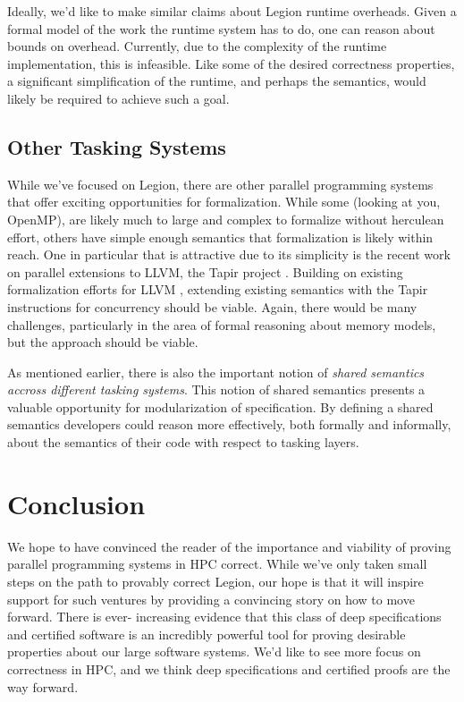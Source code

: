 \documentclass[sigconf]{acmart}
\begin{document}
Ideally, we'd like to make similar claims about Legion runtime overheads.
Given a formal model of the work the runtime system has to do, one can reason
about bounds on overhead. Currently, due to the complexity of the runtime
implementation, this is infeasible. Like some of the desired correctness
properties, a significant simplification of the runtime, and perhaps the
semantics, would likely be required to achieve such a goal.


\subsection{Other Tasking Systems}

While we've focused on Legion, there are other parallel programming systems
that offer exciting opportunities for formalization. While some (looking at
you, OpenMP), are likely much to large and complex to formalize without
herculean effort, others have simple enough semantics that formalization is
likely within reach. One in particular that is attractive due to its simplicity
is the recent work on parallel extensions to LLVM, the Tapir project
\cite{schardl2017tapir}. Building on existing formalization efforts for LLVM
\cite{zhao2012formalizing}, extending existing semantics with the Tapir instructions for
concurrency should be viable. Again, there would be many challenges,
particularly in the area of formal reasoning about memory models, but the
approach should be viable.

As mentioned earlier, there is also the important notion of \emph{shared
semantics accross different tasking systems}. This notion of shared semantics
presents a valuable opportunity for modularization of specification. By defining
a shared semantics developers could reason more effectively, both formally and
informally, about the semantics of their code with respect to tasking layers.

\section{Conclusion}

We hope to have convinced the reader of the importance and viability of proving
parallel programming systems in HPC correct. While we've only taken small steps
on the path to provably correct Legion, our hope is that it will inspire
support for such ventures by providing a convincing story on how to move
forward. There is ever- increasing evidence that this class of deep
specifications and certified software is an incredibly powerful tool for
proving desirable properties about our large software systems. We'd like to see
more focus on correctness in HPC, and we think deep specifications and
certified proofs are the way forward.




\end{document}
